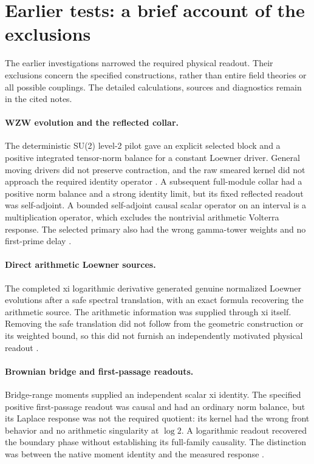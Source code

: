 \section{Earlier tests: a brief account of the exclusions}
\label{sec:previous}

The earlier investigations narrowed the required physical readout.
Their exclusions concern the specified constructions, rather than
entire field theories or all possible couplings. The detailed
calculations, sources and diagnostics remain in the cited notes.

\paragraph{WZW evolution and the reflected collar.}
The deterministic SU(2) level-2 pilot gave an explicit selected block
and a positive integrated tensor-norm balance for a constant Loewner
driver. General moving drivers did not preserve contraction, and the
raw smeared kernel did not approach the required identity operator
\cite{PilotNote}. A subsequent full-module collar had a positive norm
balance and a strong identity limit, but its fixed reflected readout
was self-adjoint. A bounded self-adjoint causal scalar operator on an
interval is a multiplication operator, which excludes the nontrivial
arithmetic Volterra response. The selected primary also had the wrong
gamma-tower weights and no first-prime delay \cite{CollarNote}.

\paragraph{Direct arithmetic Loewner sources.}
The completed xi logarithmic derivative generated genuine normalized
Loewner evolutions after a safe spectral translation, with an exact
formula recovering the arithmetic source. The arithmetic information
was supplied through xi itself. Removing the safe translation did not
follow from the geometric construction or its weighted bound, so this
did not furnish an independently motivated physical readout
\cite{SourceNote}.

\paragraph{Brownian bridge and first-passage readouts.}
Bridge-range moments supplied an independent scalar xi identity. The
specified positive first-passage readout was causal and had an ordinary
norm balance, but its Laplace response was not the required quotient:
its kernel had the wrong front behavior and no arithmetic singularity
at $\log2$. A logarithmic readout recovered the boundary phase without
establishing its full-family causality. The distinction was between
the native moment identity and the measured response
\cite{SearchNote,BrownianNote}.

